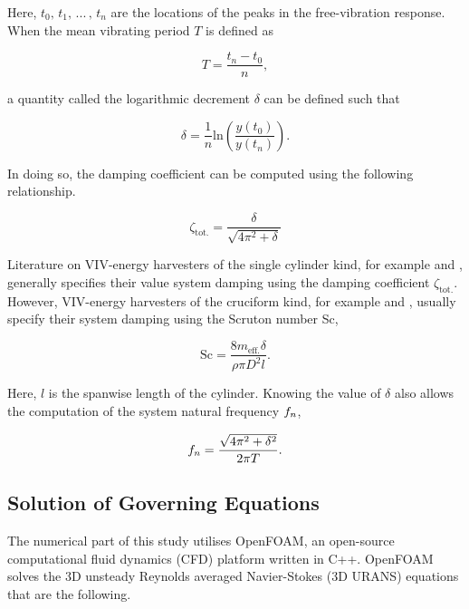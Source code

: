 \documentclass[oneside]{utmthesis}
\begin{document}
\noindent Here, $t_{0}, \, t_{1}, \, ... \, , \, t_{n}$ are the locations of the peaks in the free-vibration response. When the mean vibrating period $T$ is defined as

\begin{equation}
  T = \frac{t_{n} - t_{0}}{n},
  \label{eq:meanPeriod}
\end{equation}

\noindent a quantity called the logarithmic decrement $\delta$ can be defined such that

\begin{equation}
  \delta = \frac{1}{n} \text{ln} \left( \frac{y(t_{0})}{y(t_{n})} \right).
  \label{eq:logDecrement}
\end{equation}

\noindent In doing so, the damping coefficient can be computed \citep{Sinha2010} using the following relationship.

\begin{equation}
  \zeta_{\text{tot.}} = \frac{\delta}{\sqrt{4 \pi^{2} + \delta}}
  \label{eq:dampingCoeff}
\end{equation}

\noindent Literature on VIV-energy harvesters of the single cylinder kind, for example \citet{Yuan2020} and \citet{Kim2021}, generally specifies their value system damping using the damping coefficient $\zeta_{\text{tot.}}$. However, VIV-energy harvesters of the cruciform kind, for example \citet{Adzlan2021} and \citet{Mohamed2021}, usually specify their system damping using the Scruton number Sc,

\begin{equation}
  \text{Sc} = \frac{8 m_{\text{eff.}} \delta}{\rho \pi D^{2} l}.
  \label{eq:scrutonNo}
\end{equation}

\noindent Here, $l$ is the spanwise length of the cylinder. Knowing the value of $\delta$ also allows the computation of the system natural frequency $f_{n}$,

\begin{equation}
  f_{n} = \frac{\sqrt{4 \pi^{2} + \delta^{2}}}{2 \pi T}.
  \label{eq:naturalFrequency}
\end{equation}

\subsection{Solution of Governing Equations} \label{ssec:govEquations}

The numerical part of this study utilises OpenFOAM, an open-source computational fluid dynamics (CFD) platform written in C++. OpenFOAM solves the 3D unsteady Reynolds averaged Navier-Stokes (3D URANS) equations that are the following.
\end{document}
